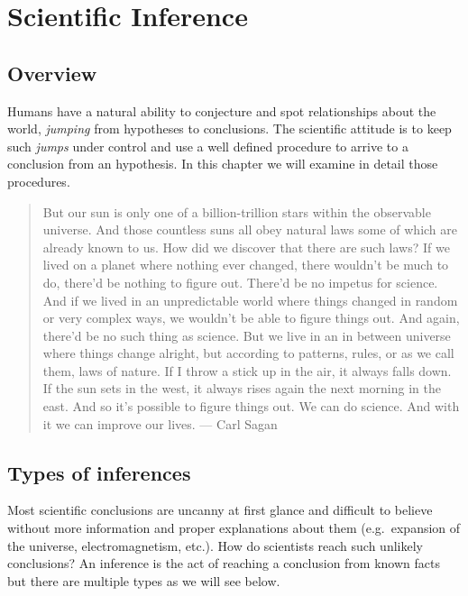 \documentclass[
]{book}
\begin{document}
\hypertarget{scientific-inference}{%
\chapter{Scientific Inference}\label{scientific-inference}}

\hypertarget{overview}{%
\section{Overview}\label{overview}}

Humans have a natural ability to conjecture and spot relationships about the world, \emph{jumping} from hypotheses to conclusions. The scientific attitude is to keep such \emph{jumps} under control and use a well defined procedure to arrive to a conclusion from an hypothesis. In this chapter we will examine in detail those procedures.

\begin{quote}
But our sun is only one of a billion-trillion stars within the observable universe. And those countless suns all obey natural laws some of which are already known to us. How did we discover that there are such laws? If we lived on a planet where nothing ever changed, there wouldn't be much to do, there'd be nothing to figure out. There'd be no impetus for science. And if we lived in an unpredictable world where things changed in random or very complex ways, we wouldn't be able to figure things out. And again, there'd be no such thing as science. But we live in an in between universe where things change alright, but according to patterns, rules, or as we call them, laws of nature. If I throw a stick up in the air, it always falls down. If the sun sets in the west, it always rises again the next morning in the east. And so it's possible to figure things out. We can do science. And with it we can improve our lives. --- Carl Sagan
\end{quote}

\hypertarget{types-of-inferences}{%
\section{Types of inferences}\label{types-of-inferences}}

Most scientific conclusions are uncanny at first glance and difficult to believe without more information and proper explanations about them (e.g.~expansion of the universe, electromagnetism, etc.). How do scientists reach such unlikely conclusions? An inference is the act of reaching a conclusion from known facts but there are multiple types as we will see below.
\end{document}
